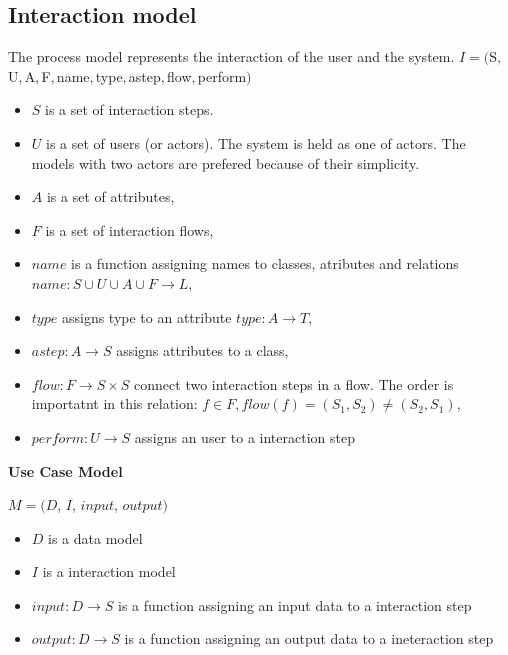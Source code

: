 ﻿\documentclass[10pt,a4paper]{article}
\begin{document}
\subsection{Interaction model}
The process model represents the interaction of the user and the system.
$I=($S$, $U$, $A$, $F$, $name$, $type$, $astep$, $flow$, $perform$)$
\begin{itemize}
	\item $S$ is a set of interaction steps.
	\item $U$ is a set of users (or actors). The system is held as one of actors. The models with two actors are prefered because of their simplicity. 
	\item $A$ is a set of attributes,
	\item $F$ is a set of interaction flows,
	\item $name$ is a function assigning names to classes, atributes and relations $name: S \cup U \cup A \cup F \rightarrow L$,
	\item $type$ assigns type to an attribute $type: A \rightarrow T$,
	\item $astep: A \rightarrow S$ assigns attributes to a class,
	\item $flow: F \rightarrow S \times S$ connect two interaction steps in a flow. The order is importatnt in this relation: $f \in F, flow(f)=(S_1, S_2)\neq(S_2, S_1)$,
	\item $perform: U \rightarrow S$ assigns an user to a interaction step 
\end{itemize}


\textbf{Use Case Model}

$M = (D$, $I$, $input$, $output)$
\begin{itemize}
	\item $D$ is a data model
	\item $I$ is a interaction model
	\item $input: D \rightarrow S$ is a function assigning an input data to a interaction step
	\item $output: D \rightarrow S$ is a function assigning an output data to a ineteraction step
\end{itemize}
\end{document}
